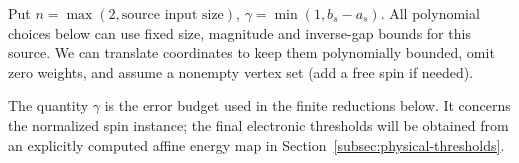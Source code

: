 Put \(n=\max(2,\text{source input size})\), \(\gamma=\min(1,b_s-a_s)\). All polynomial choices below can use fixed size, magnitude and inverse-gap bounds for this source. We can translate coordinates to keep them polynomially bounded, omit zero weights, and assume a nonempty vertex set (add a free spin if needed).

The quantity $\gamma$ is the error budget used in the finite reductions
below. It concerns the normalized spin instance; the final electronic
thresholds will be obtained from an explicitly computed affine energy
map in Section~\ref{subsec:physical-thresholds}.
